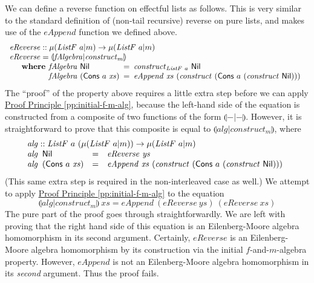 \documentclass{jfp1}
\newcommand{\eFold}[2]{\llparenthesis #1|#2 \rrparenthesis}
\newcommand{\proofprinref}[1]{\hyperref[#1]{Proof Principle \ref*{#1}}}
\newcommand{\kw}[1]{\textbf{#1}}
\begin{document}
We can define a reverse function on effectful lists as follows. This
is very similar to the standard definition of (non-tail recursive)
reverse on pure lists, and makes use of the $\mathit{eAppend}$
function we defined above.
\begin{displaymath}
  \begin{array}{l}
    \mathit{eReverse} :: \mu(\mathit{ListF}~a|m) \to \mu(\mathit{ListF}~a|m) \\
    \mathit{eReverse} = \eFold{\mathit{fAlgebra}}{\mathit{construct}_m} \\
    \quad\begin{array}{r@{\hspace{0.4em}}l@{\hspace{0.5em}}c@{\hspace{0.5em}}l}
      \kw{where} & \mathit{fAlgebra}~\mathsf{Nil} &=& \mathit{construct}_{\mathit{ListF}~a}~\mathsf{Nil} \\
      & \mathit{fAlgebra}~(\mathsf{Cons}~a~\mathit{xs}) &=& \mathit{eAppend}~\mathit{xs}~(\mathit{construct}~(\mathsf{Cons}~a~(\mathit{construct}~\mathsf{Nil})))
    \end{array}
  \end{array}
\end{displaymath}
The ``proof'' of the property above requires a little extra step
before we can apply \proofprinref{pp:initial-f-m-alg}, because the
left-hand side of the equation is constructed from a composite of two
functions of the form $\eFold{-}{-}$. However, it is
straightforward to prove that this composite is equal to
$\eFold{\mathit{alg}}{\mathit{construct}_m}$, where
\begin{displaymath}
  \begin{array}{l}
    \mathit{alg} :: \mathit{ListF}~a~(\mu(\mathit{ListF}~a|m)) \to \mu(\mathit{ListF}~a|m) \\
    \begin{array}{@{}l@{\hspace{0.5em}}lcl}
      \mathit{alg}&\mathsf{Nil} &=& \mathit{eReverse}~\mathit{ys} \\
      \mathit{alg}&(\mathsf{Cons}~a~\mathit{xs}) & =& \mathit{eAppend}~\mathit{xs}~(\mathit{construct}~(\mathsf{Cons}~a~(\mathit{construct}~\mathsf{Nil})))
    \end{array}
  \end{array}
\end{displaymath}
(This same extra step is required in the non-interleaved case as
well.) We attempt to apply \proofprinref{pp:initial-f-m-alg} to the
equation
\begin{displaymath}
  \eFold{\mathit{alg}}{\mathit{construct}_m}~\mathit{xs} = \mathit{eAppend}~(\mathit{eReverse}~\mathit{ys})~(\mathit{eReverse}~\mathit{xs})
\end{displaymath}
The pure part of the proof goes through straightforwardly. We are left
with proving that the right hand side of this equation is an
Eilenberg-Moore algebra homomorphism in its second
argument. Certainly, $\mathit{eReverse}$ is an Eilenberg-Moore algebra
homomorphism by its construction via the initial $f$-and-$m$-algebra
property. However, $\mathit{eAppend}$ is not an Eilenberg-Moore
algebra homomorphism in its \emph{second} argument. Thus the proof
fails.
\end{document}
